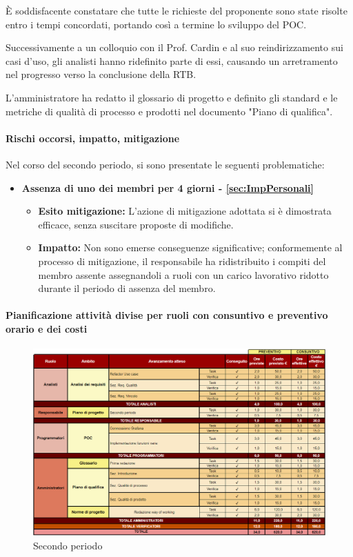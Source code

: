 È soddisfacente constatare che tutte le richieste del proponente sono state risolte entro i tempi concordati, portando così a termine lo sviluppo del POC.

Successivamente a un colloquio con il Prof. Cardin e al suo reindirizzamento sui casi d'uso, gli analisti hanno ridefinito parte di essi, causando un arretramento nel progresso verso la conclusione della RTB.

L'amministratore ha redatto il glossario di progetto e definito gli standard e le metriche di qualità di processo e prodotti nel documento "Piano di qualifica".

\paragraph{Rischi occorsi, impatto, mitigazione} 

Nel corso del secondo periodo, si sono presentate le seguenti problematiche:
\begin{itemize}
    \item \textbf{Assenza di uno dei membri per 4 giorni - \ref{sec:ImpPersonali}}
    \begin{itemize}
        \item \textbf{Esito mitigazione:} 
        L'azione di mitigazione adottata si è dimostrata efficace, senza suscitare proposte di modifiche.
        \item \textbf{Impatto:}
        Non sono emerse conseguenze significative; conformemente al processo di mitigazione, il responsabile ha ridistribuito i compiti del membro assente assegnandoli a ruoli con un carico lavorativo ridotto durante il periodo di assenza del membro.
        \end{itemize}
\end{itemize}

\newpage
\paragraph{Pianificazione attività divise per ruoli con consuntivo e preventivo orario e dei costi}\hspace{1pt}

\begin{figure}[H]
    \centering
    \includegraphics[width=\linewidth, height=0.9\textheight, keepaspectratio]{../Images/periodo2.PNG}
    \caption{Secondo periodo}
    \label{fig:Secondo_periodo}
\end{figure}

